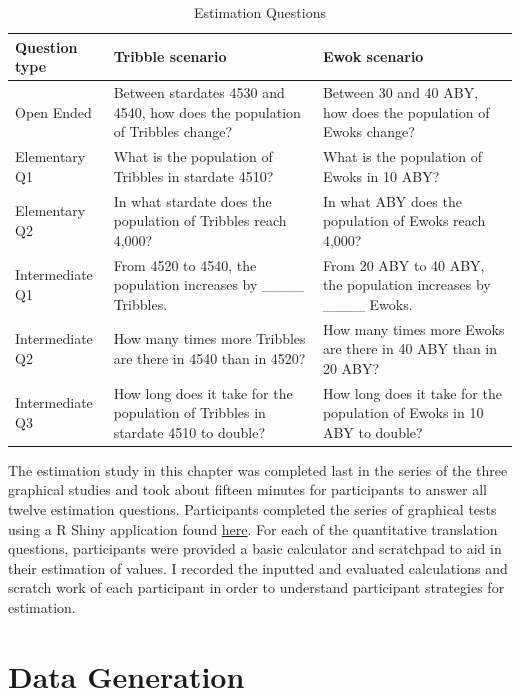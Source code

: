\documentclass[print]{nuthesis}
\begin{document}
\begin{table}

\caption{\label{tab:estimation-questions-table}Estimation Questions}
\centering
\begin{tabular}[t]{l>{\raggedright\arraybackslash}p{10em}>{\raggedright\arraybackslash}p{10em}}
\toprule
Question type & Tribble scenario & Ewok scenario\\
\midrule
Open Ended & Between stardates 4530 and 4540, how does the population of Tribbles change? & Between 30 and 40 ABY, how does the population of Ewoks change?\\
Elementary Q1 & What is the population of Tribbles in stardate 4510? & What is the population of Ewoks in 10 ABY?\\
Elementary Q2 & In what stardate does the population of Tribbles reach 4,000? & In what ABY does the population of Ewoks reach 4,000?\\
Intermediate Q1 & From 4520 to 4540, the population increases by \_\_\_\_ Tribbles. & From 20 ABY to 40 ABY, the population increases by \_\_\_\_ Ewoks.\\
Intermediate Q2 & How many times more Tribbles are there in 4540 than in 4520? & How many times more Ewoks are there in 40 ABY than in 20 ABY?\\
\addlinespace
Intermediate Q3 & How long does it take for the population of Tribbles in stardate 4510 to double? & How long does it take for the population of Ewoks in 10 ABY to double?\\
\bottomrule
\end{tabular}
\end{table}

The estimation study in this chapter was completed last in the series of the three graphical studies and took about fifteen minutes for participants to answer all twelve estimation questions.
Participants completed the series of graphical tests using a R Shiny application found \href{https://shiny.srvanderplas.com/perception-of-statistical-graphics/}{here}.
For each of the quantitative translation questions, participants were provided a basic calculator and scratchpad to aid in their estimation of values.
I recorded the inputted and evaluated calculations and scratch work of each participant in order to understand participant strategies for estimation.

\hypertarget{data-generation-3}{%
\section{Data Generation}\label{data-generation-3}}
\end{document}
